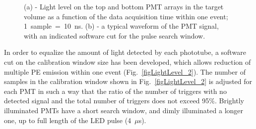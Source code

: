 \begin{figure}[!h]
\centering
{}
\caption[Light level on the top and bottom PMT arrays in the target volume, and a typical waveform of the PMT signal]{(a) - Light level on the top and bottom PMT arrays in the target volume as a function of the data acquisition time within one event; 1~sample~=~10~ns. (b) - a typical waveform of the PMT signal, with an indicated software cut for the pulse search window.}
\label{figLightLevel}
\end{figure}

In order to equalize the amount of light detected by each phototube, a software cut on the calibration window size has been developed, which allows reduction of multiple PE emission within one event (Fig.~\ref{figLightLevel_2}). The number of samples in the calibration window shown in Fig.~\ref{figLightLevel_2} is adjusted for each PMT in such a way that the ratio of the number of triggers with no detected signal and the total number of triggers does not exceed 95\%. Brightly illuminated PMTs have a short search window, and dimly illuminated a longer one, up to full length of the LED pulse (4~$\mu$s).


